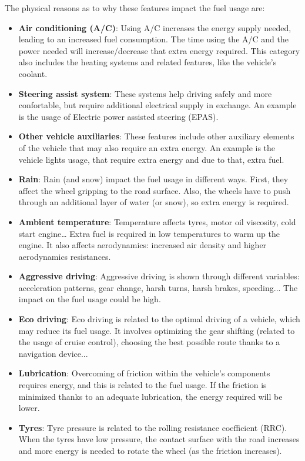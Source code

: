 The physical reasons as to why these features impact the fuel usage are:
\begin{itemize}
\item \textbf{Air conditioning (A/C)}: Using A/C increases the energy supply needed, leading to an increased fuel consumption. The time using the A/C and the power needed will increase/decrease that extra energy required. This category also includes the heating systems and related features, like the vehicle's coolant.
\item \textbf{Steering assist system}: These systems help driving safely and more confortable, but require additional electrical supply in exchange. An example is the usage of Electric power assisted steering (EPAS).
\item \textbf{Other vehicle auxiliaries}: These features include other auxiliary elements of the vehicle that may also require an extra energy. An example is the vehicle lights usage, that require extra energy and due to that, extra fuel.
\item \textbf{Rain}: Rain (and snow) impact the fuel usage in different ways. First, they affect the wheel gripping to the road surface. Also, the wheels have to push through an additional layer of water (or snow), so extra energy is required.
\item \textbf{Ambient temperature}: Temperature affects tyres, motor oil viscosity, cold start engine… Extra fuel is required in low temperatures to warm up the engine. It also affects aerodynamics: increased air density and higher aerodynamics resistances.
\item \textbf{Aggressive driving}: Aggressive driving is shown through different variables: acceleration patterns, gear change, harsh turns, harsh brakes, speeding... The impact on the fuel usage could be high.
\item \textbf{Eco driving}: Eco driving is related to the optimal driving of a vehicle, which may reduce its fuel usage. It involves optimizing the gear shifting (related to the usage of cruise control), choosing the best possible route thanks to a navigation device...
\item \textbf{Lubrication}: Overcoming of friction within the vehicle's components requires energy, and this is related to the fuel usage. If the friction is minimized thanks to an adequate lubrication, the energy required will be lower.
\item \textbf{Tyres}: Tyre pressure is related to the rolling resistance coefficient (RRC). When the tyres have low pressure, the contact surface with the road increases and more energy is needed to rotate the wheel (as the friction increases). 

\end{itemize}
